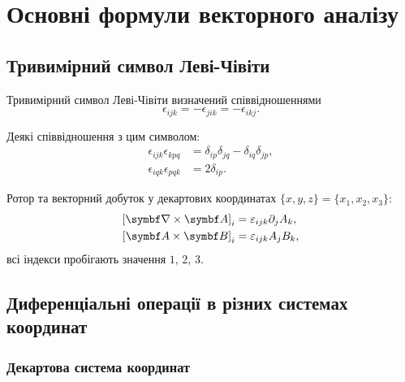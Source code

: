 
\section{Основні формули векторного аналізу}\label{Vanaliz}

\subsection{Тривимірний символ Леві-Чівіти}\label{Levi-Chiv}

Тривимірний символ Леві-Чівіти визначений співвідношеннями
\begin{equation}\label{eq:Levi-Chiv}
\epsilon_{ijk} =  - \epsilon_{jik} =  - \epsilon_{ikj}.
\end{equation}

Деякі співвідношення з цим символом:
\begin{align}
    \epsilon_{ijk}\epsilon_{kpq} &= \delta_{ip}\delta_{jq} - \delta_{iq}\delta_{jp}, \\
    \epsilon_{iqk}\epsilon_{pqk} &= 2\delta _{ip}.
\end{align}

Ротор та векторний добуток у декартових координатах $\{x,y,z\} = \{x_1, x_2, x_3\}$:
\begin{align}
\left[\rot\vect{A} \right]_i &= \epsilon_{ijk}{\partial_j}{A_k}, \\
\left[ \vect{A} \times \vect{B} \right]_i &= \epsilon_{ijk}{A_j}{B_k},
\end{align}
всі індекси пробігають значення $1$, $2$, $3$.

\subsection{Диференціальні операції в різних системах координат}

\subsubsection{Декартова система координат}

